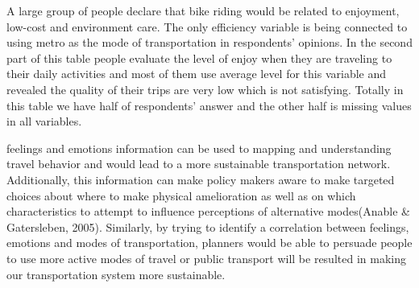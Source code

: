 \documentclass[
11pt, %
oneside, %
english, %
singlespacing, %
]{macthesis} %
\begin{document}
A large group of people declare that bike riding would be related to enjoyment, low-cost and environment care. The only efficiency variable is being connected to using metro as the mode of transportation in respondents' opinions. In the second part of this table people evaluate the level of enjoy when they are traveling to their daily activities and most of them use average level for this variable and revealed the quality of their trips are very low which is not satisfying. Totally in this table we have half of respondents' answer and the other half is missing values in all variables.

feelings and emotions information can be used to mapping and understanding travel behavior and would lead to a more sustainable transportation network. Additionally, this information can make policy makers aware to make targeted choices about where to make physical amelioration as well as on which characteristics to attempt to influence perceptions of alternative modes(Anable \& Gatersleben, 2005). Similarly, by trying to identify a correlation between feelings, emotions and modes of transportation, planners would be able to persuade people to use more active modes of travel or public transport will be resulted in making our transportation system more sustainable.
\end{document}
